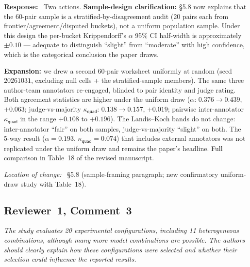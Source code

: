 \documentclass[11pt,a4paper]{article}
\newenvironment{reviewerquote}
  {\begin{tcolorbox}[colback=black!5, colframe=black!15, boxrule=0.3pt,
                     arc=1pt, left=6pt, right=6pt, top=3pt, bottom=3pt,
                     breakable]\itshape\small}
  {\end{tcolorbox}}
\newcommand{\rcomment}[2]{\subsection*{Reviewer~#1, Comment~#2}}
\newcommand{\response}{\noindent\textbf{Response:}\ }
\newcommand{\loc}{\par\smallskip\noindent\textit{Location of change:}\ }
\begin{document}
\response{}
Two actions. \textbf{Sample-design clarification:} \S5.8 now explains that the 60-pair sample is a stratified-by-disagreement audit (20 pairs each from frontier/agreement/disputed buckets), not a uniform population sample. Under this design the per-bucket Krippendorff's $\alpha$ 95\% CI half-width is approximately $\pm 0.10$ --- adequate to distinguish ``slight'' from ``moderate'' with high confidence, which is the categorical conclusion the paper draws.

\textbf{Expansion:} we drew a second 60-pair worksheet uniformly at random (seed $20261031$, excluding null cells + the stratified-sample members). The same three author-team annotators re-engaged, blinded to pair identity and judge rating. Both agreement statistics are higher under the uniform draw ($\alpha$: $0.376 \to 0.439$, $+0.063$; judge-vs-majority $\kappa_{\textsf{quad}}$: $0.138 \to 0.157$, $+0.019$; pairwise inter-annotator $\kappa_{\textsf{quad}}$ in the range $+0.108$ to $+0.196$). The Landis--Koch bands do not change: inter-annotator ``fair'' on both samples, judge-vs-majority ``slight'' on both. The 5-way result ($\alpha = 0.193$, $\kappa_{\textsf{quad}} = 0.074$) that includes external annotators was not replicated under the uniform draw and remains the paper's headline. Full comparison in Table~18 of the revised manuscript.

\loc{} \S5.8 (sample-framing paragraph; new confirmatory uniform-draw study with Table~18).

\rcomment{1}{3}

\begin{reviewerquote}
The study evaluates 20 experimental configurations, including 11 heterogeneous combinations, although many more model combinations are possible. The authors should clearly explain how these configurations were selected and whether their selection could influence the reported results.
\end{reviewerquote}
\end{document}
